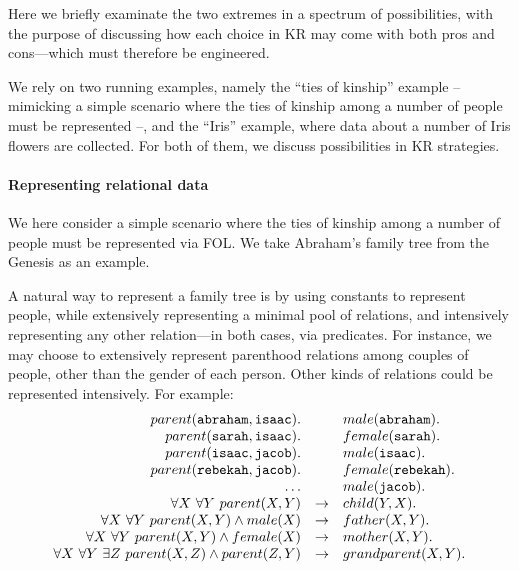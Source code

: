 \documentclass[12pt,a4paper,openright,twoside]{book}
\begin{document}
Here we briefly examinate the two extremes in a spectrum of possibilities, with the purpose of discussing how each choice in KR may come with both pros and cons---which must therefore be engineered.

We rely on two running examples, namely the ``ties of kinship'' example -- mimicking a simple scenario where the ties of kinship among a number of people must be represented --, and the ``Iris'' example, where data about a number of Iris flowers are collected.
%
For both of them, we discuss possibilities in KR strategies.

\paragraph{Representing relational data}

We here consider a simple scenario where the ties of kinship among a number of people must be represented via FOL.
%
We take Abraham's family tree from the Genesis as an example.

A natural way to represent a family tree is by using constants to represent people, while extensively representing a minimal pool of relations, and intensively representing any other relation---in both cases, via predicates.
%
For instance, we may choose to extensively represent parenthood relations among couples of people, other than the gender of each person.
%
Other kinds of relations could be represented intensively.
%
For example:
%
\begin{equation}\label{eq:abraham-family-tree}
    \begin{array}{rcl}
        parent(\mathtt{abraham}, \mathtt{isaac}). & {} & male(\mathtt{abraham}).
        \\
        parent(\mathtt{sarah}, \mathtt{isaac}). & {} & female(\mathtt{sarah}).
        \\
        parent(\mathtt{isaac}, \mathtt{jacob}). & {} & male(\mathtt{isaac}).
        \\
        parent(\mathtt{rebekah}, \mathtt{jacob}). & {} & female(\mathtt{rebekah}).
        \\
        \ldots & {} & male(\mathtt{jacob}).
        \\
        \forall X ~ \forall Y\ parent(X, Y) & \rightarrow & child(Y, X).
        \\
        \forall X ~ \forall Y\ parent(X, Y) \wedge male(X) & \rightarrow & father(X, Y).
        \\
        \forall X ~ \forall Y\ parent(X, Y) \wedge female(X) & \rightarrow & mother(X, Y).
        \\
        \forall X ~ \forall Y ~ \exists Z \ parent(X, Z) \wedge parent(Z, Y) & \rightarrow & grandparent(X, Y).
    \end{array}
\end{equation}
\end{document}
